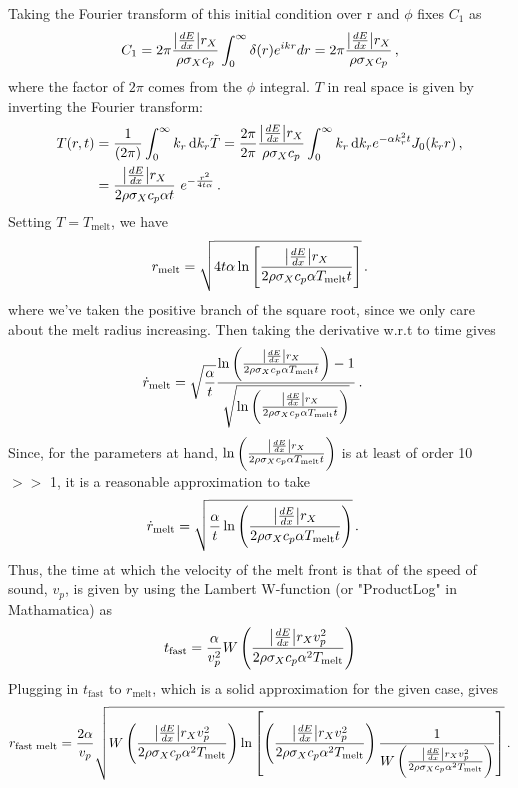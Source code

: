 \documentclass{article}
\newcommand*\diff{\mathop{}\!\mathrm{d}}
\newcommand*\te[1]{\text{#1}}
\newcommand*\p[1]{\left(#1\right)}
\newcommand*\ps[1]{\left[#1\right]}
\newcommand*\f[2]{\frac{#1}{#2}}
\begin{document}
Taking the Fourier transform of this initial condition over r and $\phi$ fixes $C_1$ as 
\begin{align}
C_1 =  2\pi \f{\abs{\frac{dE}{dx}}r_X}{\rho \sigma_X c_p}\int_{0}^{\infty}\delta(r)e^{i k r} dr = 2\pi\f{\abs{\frac{dE}{dx}}r_X}{\rho \sigma_X c_p}\,,
\end{align}
where the factor of $2 \pi$ comes from the $\phi$ integral.
$T$ in real space is given by inverting the Fourier transform:
\begin{align}
T(r,t) &=\frac{1}{\p{2\pi}} \int_0^\infty k_r \diff{k_r}\tilde{T} = \frac{2\pi}{2\pi}\f{\abs{\frac{dE}{dx}}r_X}{\rho \sigma_X c_p}\int_0^\infty k_r\diff k_r e^{-\alpha k_r^2 t}J_0(k_r r)\,,\\
&=\f{\abs{\frac{dE}{dx}}r_X}{2 \rho \sigma_X c_p \alpha t}\ e^{-\f{r^2}{4t\alpha}}\,.
\end{align}
Setting $T = T_\te{melt}$, we have
\begin{align}
r_\te{melt} = \sqrt{4t\alpha\ln\ps{\f{\abs{\frac{dE}{dx}}r_X}{2 \rho \sigma_X c_p \alpha T_\te{melt} t}}}\,.
\end{align}
where we've taken the positive branch of the square root, since we only care about the melt radius increasing. Then taking the derivative w.r.t to time gives
\begin{align}
\dot r_\te{melt} &=\sqrt{\f{\alpha}{t}}\f{\ln\p{\f{\abs{\frac{dE}{dx}}r_X}{2 \rho \sigma_X c_p \alpha T_\te{melt} t}} - 1}{\sqrt{\ln\p{\f{\abs{\frac{dE}{dx}} r_X}{2 \rho \sigma_X c_p \alpha T_\te{melt} t}}}}\,.
\end{align}
Since, for the parameters at hand, $\ln\p{\f{\abs{\frac{dE}{dx}}r_X}{2 \rho \sigma_X c_p \alpha T_\te{melt} t}}$ is at least of order 10 $>>$ 1, it is a reasonable approximation to take
\begin{align}
\dot r_\te{melt} &=\sqrt{\f{\alpha}{t}\ln\p{\frac{\abs{\frac{dE}{dx}}r_X}{2 \rho \sigma_X c_p \alpha T_\te{melt} t}}}\,.
\end{align}
Thus, the time at which the velocity of the melt front is that of the speed of sound, $v_p$, is given by using the Lambert W-function (or "ProductLog" in Mathamatica) as
\begin{align}
t_{\te{fast}} = \f{\alpha}{v_p^2}W\p{{\f{\abs{\frac{dE}{dx}}r_Xv_p^2}{2 \rho \sigma_X c_p \alpha^2 T_\te{melt}}}}
\end{align}
Plugging in $t_{\te{fast}}$ to $r_\te{melt}$, which is a solid approximation for the given case, gives
\begin{align}
r_\te{fast melt} =  \frac{2\alpha}{v_p}\sqrt{W\p{{\f{\abs{\frac{dE}{dx}}r_{X}v_p^2}{2 \rho \sigma_X c_p \alpha^2 T_\te{melt}}}}\ln\ps{\p{\frac{\abs{\frac{dE}{dx}}r_{X}v_p^2}{2 \rho \sigma_X c_p \alpha^2 T_\te{melt}}}\frac{1}{W\p{{\f{\abs{\frac{dE}{dx}}r_{X}v_p^2}{2 \rho \sigma_X c_p \alpha^2 T_\te{melt}}}}
}}}\,.
\end{align}
\end{document}
